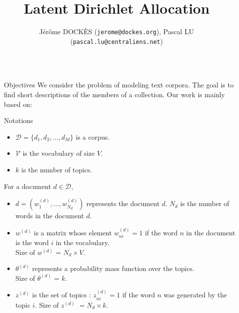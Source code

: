 \documentclass[final]{beamer}
\title{Latent Dirichlet Allocation \medskip} %
\author{J\'er\^ome DOCK\`ES {\small{(\texttt{jerome@dockes.org})}}, Pascal LU  {\small{(\texttt{pascal.lu@centraliens.net})}} } %
\institute{\'Ecole Normale Sup\'erieure de Cachan $-$ \today} %
\newlength{\sepwid}
\newlength{\onecolwid}
\begin{document}

\setlength{\belowcaptionskip}{2ex} %
\setlength\belowdisplayshortskip{2ex} %

\begin{frame}[t] 
\begin{columns}[t]


\begin{column}{\sepwid}\end{column} %

\begin{column}{\onecolwid}

\begin{alertblock}{Objectives}
We consider the problem of modeling text corpora. The goal is to find short descriptions of the members of a collection. Our work is mainly based on:
\nocite{*}
\small{}
\end{alertblock}


\begin{block}{Notations}
\begin{itemize}
  \item $\mathcal{D} = \{d_{1},d_{2}, \ldots, d_{M}\}$ is a corpus.
  \item $\mathcal{V}$ is the vocabulary of size $V$.
  \item $k$ is the number of topics.
\end{itemize}

For a document $d \in \mathcal{D}$,
\begin{itemize}  
  \item $d = (w_1^{(d)}, \ldots, w_{N_d}^{(d)})$ represents the document $d$. $N_d$ is the number of words in the document $d$.
  \item $w^{(d)}$ is a matrix whose element $w_{ni}^{(d)} = 1$ if the word $n$ in the document is the word $i$ in the vocabulary. \\ Size of $w^{(d)}$ = $N_d \times V$.
 \item $\theta^{(d)}$ represents a probability mass function over the topics. \\ Size of $\theta^{(d)}$ = $k$.
 \item $z^{(d)}$ is the set of topics : $z_{ni}^{(d)} =  1$ if the word $n$ was generated by the topic $i$. Size of $z^{(d)}$ $= N_d \times k$.
\end{itemize}
\end{block}


\end{column}
\end{columns}
\end{frame}
\end{document}

